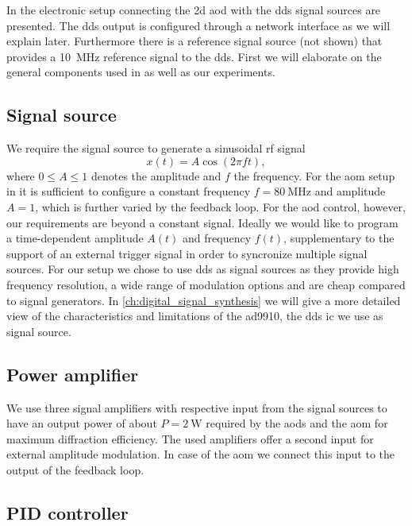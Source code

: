 In  the electronic setup connecting the \gls{2d}
\gls{aod} with the \gls{dds} signal sources are presented. The \gls{dds}
output is configured through a network interface as we will explain later.
Furthermore there is a reference signal source (not shown) that provides a
\SI{10}{\mega\hertz} reference signal to the \gls{dds}. First we will
elaborate on the general components used in  as well as
our experiments.

\subsection{Signal source}\label{subsec:setup_signal_source}

We require the signal source to generate a sinusoidal \gls{rf} signal
\begin{equation}
  x(t)
  =A\cos\left(2\pi ft\right)
  \label{eq:signal},
\end{equation}
where $0\leq A\leq1$ denotes the amplitude and $f$ the frequency. For the
\gls{aom} setup in  it is sufficient to configure
a constant frequency $f=\SI{80}{\mega\hertz}$ and amplitude $A=1$, which is
further varied by the feedback loop. For the \gls{aod} control, however,
our requirements are beyond a constant signal. Ideally we would like to
program a time-dependent amplitude $A(t)$ and frequency $f(t)$, supplementary
to the support of an external trigger signal in order to syncronize multiple
signal sources. For our setup we chose to use \gls{dds} as signal sources as
they provide high frequency resolution, a wide range of modulation options and
are cheap compared to signal generators. In \cref{ch:digital_signal_synthesis}
we will give a more detailed view of the characteristics and limitations of
the \gls{ad9910}, the \gls{dds} \gls{ic} we use as signal source.

\subsection{Power amplifier}

We use three signal amplifiers with respective input from the signal sources
to have an output power of about $P=\SI{2}{\watt}$ required by the \gls{aod}s
and the \gls{aom} for maximum diffraction efficiency. The used amplifiers
offer a second input for external amplitude modulation. In case of the
\gls{aom} we connect this input to the output of the feedback loop.

\subsection{PID controller}

